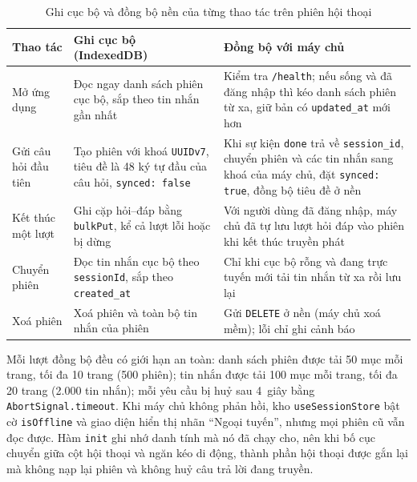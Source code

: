 \begin{table}[htbp]
\centering
\caption{Ghi cục bộ và đồng bộ nền của từng thao tác trên phiên hội thoại}
\label{tab:fe-dong-bo}
\footnotesize
\setlength{\tabcolsep}{4pt}
\begin{tabularx}{\textwidth}{
  >{\raggedright\arraybackslash}p{2.6cm}
  >{\raggedright\arraybackslash}p{5.0cm}
  >{\raggedright\arraybackslash}X
}
\toprule
\textbf{Thao tác} & \textbf{Ghi cục bộ (IndexedDB)} & \textbf{Đồng bộ với máy chủ} \\
\midrule
Mở ứng dụng & Đọc ngay danh sách phiên cục bộ, sắp theo tin nhắn gần nhất & Kiểm tra \texttt{/health}; nếu sống và đã đăng nhập thì kéo danh sách phiên từ xa, giữ bản có \texttt{updated\_\allowbreak{}at} mới hơn \\
\midrule
Gửi câu hỏi đầu tiên & Tạo phiên với khoá \texttt{UUIDv7}, tiêu đề là 48 ký tự đầu của câu hỏi, \texttt{synced: false} & Khi sự kiện \texttt{done} trả về \texttt{session\_\allowbreak{}id}, chuyển phiên và các tin nhắn sang khoá của máy chủ, đặt \texttt{synced: true}, đồng bộ tiêu đề ở nền \\
\midrule
Kết thúc một lượt & Ghi cặp hỏi--đáp bằng \texttt{bulkPut}, kể cả lượt lỗi hoặc bị dừng & Với người dùng đã đăng nhập, máy chủ đã tự lưu lượt hỏi đáp vào phiên khi kết thúc truyền phát \\
\midrule
Chuyển phiên & Đọc tin nhắn cục bộ theo \texttt{sessionId}, sắp theo \texttt{created\_\allowbreak{}at} & Chỉ khi cục bộ rỗng và đang trực tuyến mới tải tin nhắn từ xa rồi lưu lại \\
\midrule
Xoá phiên & Xoá phiên và toàn bộ tin nhắn của phiên & Gửi \texttt{DELETE} ở nền (máy chủ xoá mềm); lỗi chỉ ghi cảnh báo \\
\bottomrule
\end{tabularx}
\end{table}

Mỗi lượt đồng bộ đều có giới hạn an toàn: danh sách phiên được tải 50 mục mỗi trang, tối đa 10 trang (500 phiên); tin nhắn được tải 100 mục mỗi trang, tối đa 20 trang (2.000 tin nhắn); mỗi yêu cầu bị huỷ sau 4~giây bằng \texttt{AbortSignal.timeout}. Khi máy chủ không phản hồi, kho \texttt{useSessionStore} bật cờ \texttt{isOffline} và giao diện hiển thị nhãn ``Ngoại tuyến'', nhưng mọi phiên cũ vẫn đọc được. Hàm \texttt{init} ghi nhớ danh tính mà nó đã chạy cho, nên khi bố cục chuyển giữa cột hội thoại và ngăn kéo di động, thành phần hội thoại được gắn lại mà không nạp lại phiên và không huỷ câu trả lời đang truyền.

